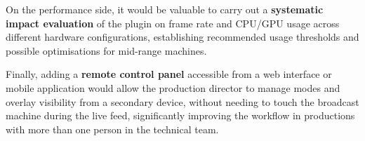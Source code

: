 On the performance side, it would be valuable to carry out a \textbf{systematic impact evaluation} of the plugin on frame rate and CPU/GPU usage across different hardware configurations, establishing recommended usage thresholds and possible optimisations for mid-range machines.

Finally, adding a \textbf{remote control panel} accessible from a web interface or mobile application would allow the production director to manage modes and overlay visibility from a secondary device, without needing to touch the broadcast machine during the live feed, significantly improving the workflow in productions with more than one person in the technical team.
